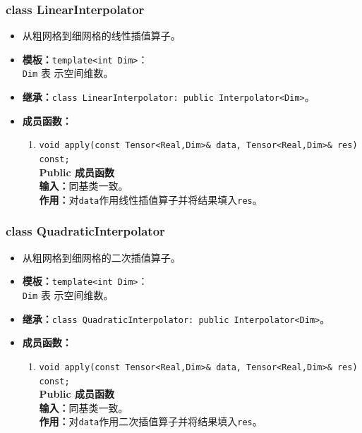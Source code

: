 \documentclass[a4paper,twoside]{ctexart}
\begin{document}
\subsubsection*{class LinearInterpolator}
\begin{itemize}
    \item 从粗网格到细网格的线性插值算子。
    \item \textbf{模板：}\texttt{template<int Dim>}：\\\texttt{Dim} 表
      示空间维数。
      \item \textbf{继承：}\texttt{class LinearInterpolator: public Interpolator<Dim>}。
    \item \textbf{成员函数：}
            \begin{enumerate}[(1)]
                \item \texttt{void apply(const Tensor<Real,Dim>\& data,
                    Tensor<Real,Dim>\& res) const;}\\
                  \textbf{Public 成员函数}\\
                \textbf{输入：}同基类一致。\\
                \textbf{作用：}对\texttt{data}作用线性插值算子并将结果填入\texttt{res}。
            \end{enumerate}
          \end{itemize}

\subsubsection*{class QuadraticInterpolator}
\begin{itemize}
    \item 从粗网格到细网格的二次插值算子。
    \item \textbf{模板：}\texttt{template<int Dim>}：\\\texttt{Dim} 表
      示空间维数。
      \item \textbf{继承：}\texttt{class QuadraticInterpolator: public Interpolator<Dim>}。
    \item \textbf{成员函数：}
            \begin{enumerate}[(1)]
                \item \texttt{void apply(const Tensor<Real,Dim>\& data,
                    Tensor<Real,Dim>\& res) const;}\\
                  \textbf{Public 成员函数}\\
                \textbf{输入：}同基类一致。\\
                \textbf{作用：}对\texttt{data}作用二次插值算子并将结果填入\texttt{res}。
            \end{enumerate}
          \end{itemize}
\end{document}
